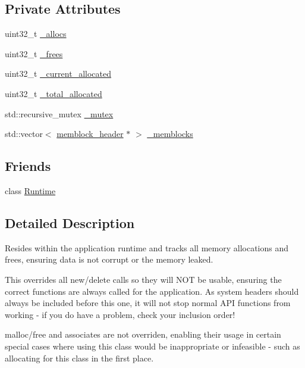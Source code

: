 \subsection*{Private Attributes}
\begin{DoxyCompactItemize}
\item 
uint32\-\_\-t \hyperlink{class_allocator_a62a5f8bb48b4417a9c20fec53dfd7201}{\-\_\-allocs}
\item 
uint32\-\_\-t \hyperlink{class_allocator_aef8120c4c4eeec914b6fb7aa609eb533}{\-\_\-frees}
\item 
uint32\-\_\-t \hyperlink{class_allocator_a3df5e505a4e72b64ea8c055e7f385bb3}{\-\_\-current\-\_\-allocated}
\item 
uint32\-\_\-t \hyperlink{class_allocator_adaa40e36af99c1828a96f264ee405331}{\-\_\-total\-\_\-allocated}
\item 
std\-::recursive\-\_\-mutex \hyperlink{class_allocator_aeb33ace056dd043efbec5ea4115ae305}{\-\_\-mutex}
\item 
std\-::vector$<$ \hyperlink{structmemblock__header}{memblock\-\_\-header} $\ast$ $>$ \hyperlink{class_allocator_a14b439fa46e392aca969b4c4cf99fd19}{\-\_\-memblocks}
\end{DoxyCompactItemize}
\subsection*{Friends}
\begin{DoxyCompactItemize}
\item 
class \hyperlink{class_allocator_af3d14e26ba8af9e6cc5a32aad8446de7}{Runtime}
\end{DoxyCompactItemize}


\subsection{Detailed Description}
Resides within the application runtime and tracks all memory allocations and frees, ensuring data is not corrupt or the memory leaked.

This overrides all new/delete calls so they will N\-O\-T be usable, ensuring the correct functions are always called for the application. As system headers should always be included before this one, it will not stop normal A\-P\-I functions from working -\/ if you do have a problem, check your inclusion order!

malloc/free and associates are not overriden, enabling their usage in certain special cases where using this class would be inappropriate or infeasible -\/ such as allocating for this class in the first place. 

